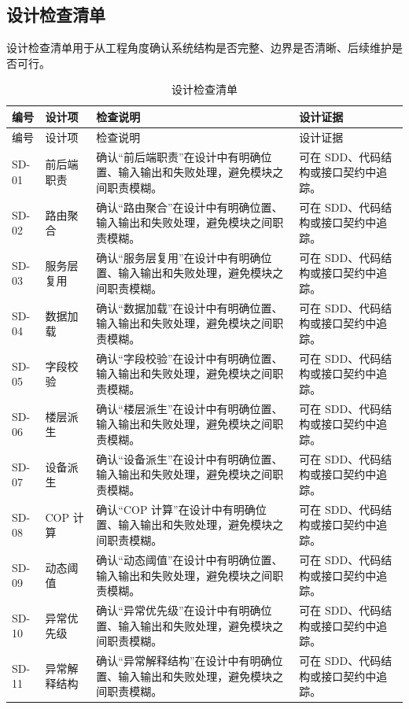 \documentclass[12pt,a4paper]{ctexart}
\begin{document}
\subsection{设计检查清单}
设计检查清单用于从工程角度确认系统结构是否完整、边界是否清晰、后续维护是否可行。
\begin{longtable}{L{1.7cm}L{3.2cm}L{6.4cm}L{4.0cm}}
\caption{设计检查清单}\\
\toprule
编号 & 设计项 & 检查说明 & 设计证据 \\
\midrule
\endfirsthead
\toprule
编号 & 设计项 & 检查说明 & 设计证据 \\
\midrule
\endhead
SD-01 & 前后端职责 & 确认“前后端职责”在设计中有明确位置、输入输出和失败处理，避免模块之间职责模糊。 & 可在 SDD、代码结构或接口契约中追踪。 \\
SD-02 & 路由聚合 & 确认“路由聚合”在设计中有明确位置、输入输出和失败处理，避免模块之间职责模糊。 & 可在 SDD、代码结构或接口契约中追踪。 \\
SD-03 & 服务层复用 & 确认“服务层复用”在设计中有明确位置、输入输出和失败处理，避免模块之间职责模糊。 & 可在 SDD、代码结构或接口契约中追踪。 \\
SD-04 & 数据加载 & 确认“数据加载”在设计中有明确位置、输入输出和失败处理，避免模块之间职责模糊。 & 可在 SDD、代码结构或接口契约中追踪。 \\
SD-05 & 字段校验 & 确认“字段校验”在设计中有明确位置、输入输出和失败处理，避免模块之间职责模糊。 & 可在 SDD、代码结构或接口契约中追踪。 \\
SD-06 & 楼层派生 & 确认“楼层派生”在设计中有明确位置、输入输出和失败处理，避免模块之间职责模糊。 & 可在 SDD、代码结构或接口契约中追踪。 \\
SD-07 & 设备派生 & 确认“设备派生”在设计中有明确位置、输入输出和失败处理，避免模块之间职责模糊。 & 可在 SDD、代码结构或接口契约中追踪。 \\
SD-08 & COP 计算 & 确认“COP 计算”在设计中有明确位置、输入输出和失败处理，避免模块之间职责模糊。 & 可在 SDD、代码结构或接口契约中追踪。 \\
SD-09 & 动态阈值 & 确认“动态阈值”在设计中有明确位置、输入输出和失败处理，避免模块之间职责模糊。 & 可在 SDD、代码结构或接口契约中追踪。 \\
SD-10 & 异常优先级 & 确认“异常优先级”在设计中有明确位置、输入输出和失败处理，避免模块之间职责模糊。 & 可在 SDD、代码结构或接口契约中追踪。 \\
SD-11 & 异常解释结构 & 确认“异常解释结构”在设计中有明确位置、输入输出和失败处理，避免模块之间职责模糊。 & 可在 SDD、代码结构或接口契约中追踪。 \\

\end{longtable}
\end{document}
